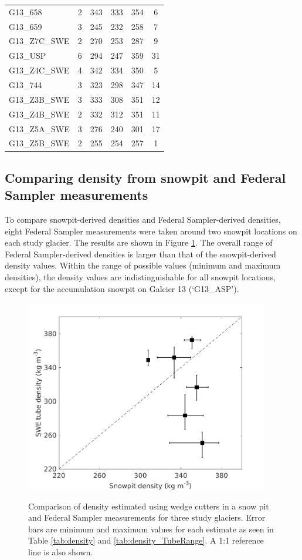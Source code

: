 \documentclass[12pt]{article}
\begin{document}
\begin{table}[]
\begin{tabular}{lccccc}
G13\_658 & 2 & 343 & 333 & 354 & 6 \\
G13\_659 & 3 & 245 & 232 & 258 & 7 \\
G13\_Z7C\_SWE & 2 & 270 & 253 & 287 & 9 \\
G13\_USP & 6 & 294 & 247 & 359 & 31 \\
G13\_Z4C\_SWE & 4 & 342 & 334 & 350 & 5 \\
G13\_744 & 3 & 323 & 298 & 347 & 14 \\
G13\_Z3B\_SWE & 3 & 333 & 308 & 351 & 12 \\
G13\_Z4B\_SWE & 2 & 332 & 312 & 351 & 11 \\
G13\_Z5A\_SWE & 3 & 276 & 240 & 301 & 17 \\
G13\_Z5B\_SWE & 2 & 255 & 254 & 257 & 1
\end{tabular}
\end{table}

\subsection{Comparing density from snowpit and Federal Sampler measurements}

To compare snowpit-derived densities and Federal Sampler-derived densities, eight Federal Sampler measurements were taken around two snowpit locations on each study glacier. The results are shown in Figure \ref{fig:density_pitVStube}. The overall range of Federal Sampler-derived densities is larger than that of the snowpit-derived density values. Within the range of possible values (minimum and maximum densities), the density values are indistinguishable for all snowpit locations, except for the accumulation snowpit on Galcier 13 (`G13\_ASP').

\begin{figure}[H]
	\centering
	\includegraphics[width =0.95\textwidth]{SnowpitVsSWEtube_all.png}\\
	\caption{Comparison of density estimated using wedge cutters in a snow pit and Federal Sampler measurements for three study glaciers. Error bars are minimum and maximum values for each estimate as seen in Table \ref{tab:density} and \ref{tab:density_TubeRange}. A 1:1 reference line is also shown.}
	\label{fig:density_pitVStube}
\end{figure}
\end{document}
